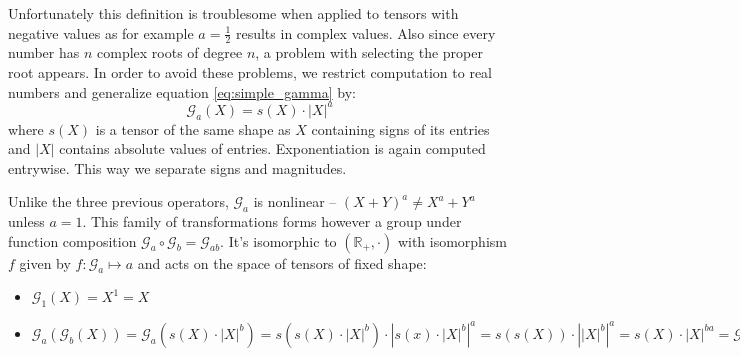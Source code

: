         Unfortunately this definition is troublesome when applied to tensors
        with negative values as for example $a=\frac{1}{2}$ results in
        complex values. Also since every number has $n$ complex roots of degree
        $n$, a problem with selecting the proper root appears. In order to avoid
        these problems, we restrict computation to real numbers and generalize
        equation \ref{eq:simple_gamma} by:
        \newcommand\mcg{\mathcal{G}}
        \begin{equation}
            \mathcal{G}_a(X) = s(X)\cdot|X|^a
            \label{eq:gamma}
        \end{equation}
        where $s(X)$ is a tensor of the same shape as $X$ containing
        signs of its entries and $|X|$ contains absolute values of entries.
        Exponentiation is again computed entrywise. This way we separate signs
        and magnitudes.
        \par Unlike the three previous operators, $\mathcal{G}_a$ is nonlinear --
        $(X+Y)^a \neq X^a + Y^a$ unless $a=1$. This family of transformations forms however a
        group under function composition $\mcg_a \circ \mcg_b = \mcg_{ab}$.
        It's isomorphic to $(\mathbb{R}_+, \cdot)$ with isomorphism $f$
        given by $f:\mcg_a \mapsto a$ and acts on the space of
        tensors of fixed shape:
        \begin{itemize}
            \item $\mathcal{G}_1(X) = X^1 = X$
            \item $\mcg_a\left(\mcg_b\left(X\right)\right) =
                \mcg_a\left(s\left(X\right)\cdot\left|X\right|^b\right) =
                s\left(s\left(X\right)\cdot\left|X\right|^b\right)
                \cdot\left|s\left(x\right)\cdot\left|X\right|^b\right|^a =
                s\left(s\left(X\right)\right)\cdot\left|\left|X\right|^b\right|^a
                = s\left(X\right)\cdot\left|X\right|^{ba} = \mcg_{ab}(X)$
        \end{itemize}



